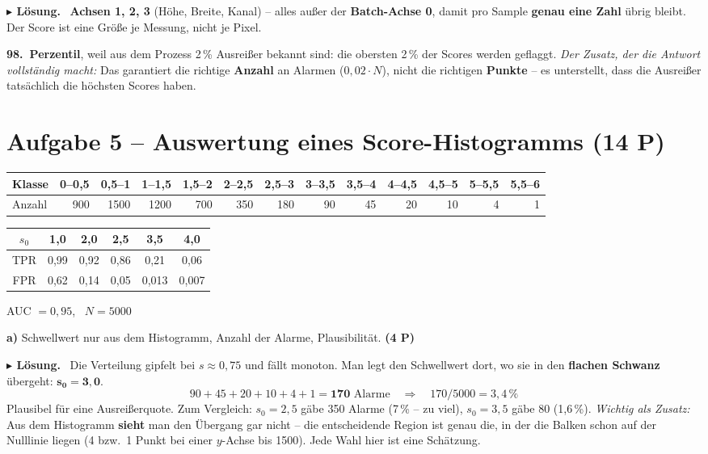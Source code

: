 \documentclass[10pt,a4paper]{article}
\newcommand{\pkt}[1]{\hfill\textbf{(#1 P)}}
\newenvironment{loes}%
  {\par\vspace{2pt}\begingroup\small\noindent\textbf{\color{loesfarbe}$\blacktriangleright$ Lösung.}\ }%
  {\endgroup\par\vspace{5pt}}
\begin{document}
\begin{loes}
\textbf{Achsen 1, 2, 3} (Höhe, Breite, Kanal) -- alles außer der \textbf{Batch-Achse 0}, damit pro
Sample \textbf{genau eine Zahl} übrig bleibt. Der Score ist eine Größe je Messung, nicht je Pixel.

\textbf{98.\ Perzentil}, weil aus dem Prozess 2\,\% Ausreißer bekannt sind: die obersten 2\,\% der
Scores werden geflaggt.
\emph{Der Zusatz, der die Antwort vollständig macht:} Das garantiert die richtige \textbf{Anzahl}
an Alarmen ($0{,}02\cdot N$), nicht die richtigen \textbf{Punkte} -- es unterstellt, dass die
Ausreißer tatsächlich die höchsten Scores haben.
\end{loes}

\newpage
\section*{Aufgabe 5 -- Auswertung eines Score-Histogramms \pkt{14}}

\begin{center}\small
\begin{tabular}{|l|r|r|r|r|r|r|r|r|r|r|r|r|}
\hline
Klasse & 0--0,5 & 0,5--1 & 1--1,5 & 1,5--2 & 2--2,5 & 2,5--3 & 3--3,5 & 3,5--4 & 4--4,5 & 4,5--5 & 5--5,5 & 5,5--6\\ \hline
Anzahl & 900 & 1500 & 1200 & 700 & 350 & 180 & 90 & 45 & 20 & 10 & 4 & 1\\ \hline
\end{tabular}
\hspace{4pt}
\begin{tabular}{|c|c|c|c|c|c|}
\hline
$s_0$ & 1,0 & 2,0 & 2,5 & 3,5 & 4,0\\ \hline
TPR & 0,99 & 0,92 & 0,86 & 0,21 & 0,06\\ \hline
FPR & 0,62 & 0,14 & 0,05 & 0,013 & 0,007\\ \hline
\end{tabular}
\quad AUC $=0{,}95$, \ $N = 5000$
\end{center}

\textbf{a)} Schwellwert nur aus dem Histogramm, Anzahl der Alarme, Plausibilität. \pkt{4}

\begin{loes}
Die Verteilung gipfelt bei $s\approx0{,}75$ und fällt monoton. Man legt den Schwellwert dort, wo
sie in den \textbf{flachen Schwanz} übergeht: $\mathbf{s_0 = 3{,}0}$.
\[
90+45+20+10+4+1 = \mathbf{170} \text{ Alarme} \quad\Longrightarrow\quad 170/5000 = 3{,}4\,\%
\]
Plausibel für eine Ausreißerquote. Zum Vergleich: $s_0=2{,}5$ gäbe 350 Alarme (7\,\% -- zu viel),
$s_0 = 3{,}5$ gäbe 80 (1,6\,\%).
\emph{Wichtig als Zusatz:} Aus dem Histogramm \textbf{sieht} man den Übergang gar nicht -- die
entscheidende Region ist genau die, in der die Balken schon auf der Nulllinie liegen (4 bzw.\ 1
Punkt bei einer $y$-Achse bis 1500). Jede Wahl hier ist eine Schätzung.
\end{loes}
\end{document}
